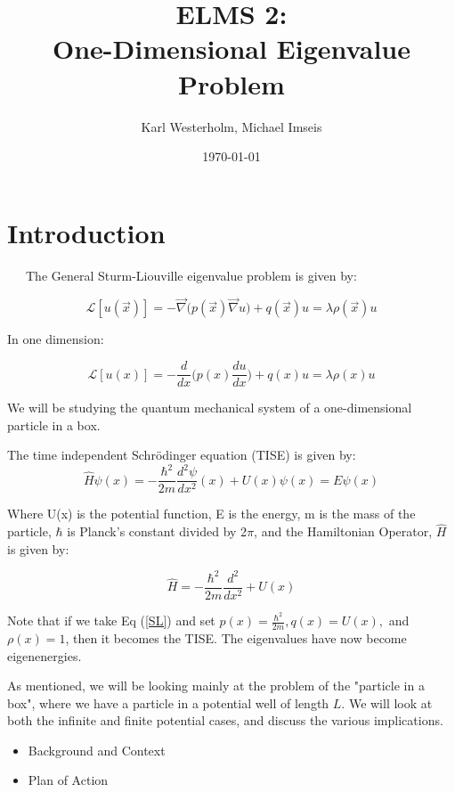 \documentclass[12pt]{article}
\title{ELMS 2: \\ One-Dimensional Eigenvalue Problem}
\author{Karl Westerholm,  Michael Imseis}
\date{\today}
\begin{document}
\maketitle

\section{Introduction}
~~~The General Sturm-Liouville eigenvalue problem is given by:

\begin{equation}
    \mathscr{L}[u(\vec{x})] = -\vec{\nabla}\dot(p(\vec{x})\vec{\nabla}u) + q(\vec{x})u = \lambda\rho(\vec{x})u
\end{equation}

In one dimension:

\begin{equation}\label{SL}
    \mathscr{L}[u(x)] = -\frac{d}{dx}\bigg(p(x)\frac{du}{dx}\bigg) + q(x)u = \lambda\rho(x)u
\end{equation}

We will be studying the quantum mechanical system of a one-dimensional particle in a box. 

The time independent Schr\"odinger equation (TISE) is given by:
\begin{equation}\label{SE}
    \hat{H}\psi(x) = -\frac{\hbar^2}{2m}\frac{d^2\psi}{dx^2}(x) + U(x)\psi(x) = E\psi(x)
\end{equation}

Where U(x) is the potential function, E is the energy, m is the mass of the particle, $\hbar$ is Planck's constant divided by 2$\pi$, and the Hamiltonian Operator, $\hat{H}$ is given by:

\begin{equation}
    \hat{H} = -\frac{\hbar^2}{2m}\frac{d^2}{dx^2} + U(x)
\end{equation}

Note that if we take Eq (\ref{SL}) and set $p(x) = \frac{\hbar^2}{2m}, q(x) = U(x),$ and $\rho(x) = 1$, then it becomes the TISE. The eigenvalues have now become eigenenergies. 

As mentioned, we will be looking mainly at the problem of the "particle in a box", where we have a particle in a potential well of length $L$. We will look at both the infinite and finite potential cases, and discuss the various implications. 

\hrulefill

\begin{itemize}
    \item Background and Context
    \item Plan of Action
\end{itemize}
\end{document}
